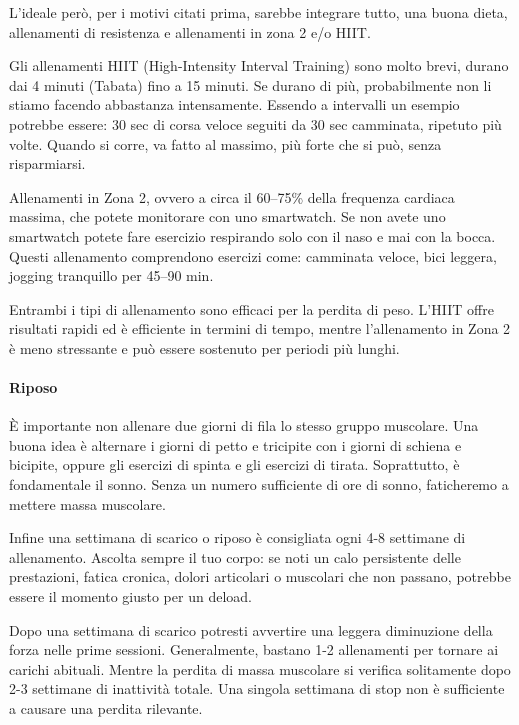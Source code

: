 \documentclass[12pt]{book} %
\begin{document}
L'ideale però, per i motivi citati prima, sarebbe integrare tutto, una buona dieta, allenamenti di resistenza e allenamenti in zona 2 e/o HIIT.

Gli allenamenti HIIT (High-Intensity Interval Training) sono molto brevi, durano dai 4 minuti (Tabata) fino a 15 minuti. Se durano di più, probabilmente non li stiamo facendo abbastanza intensamente.
Essendo a intervalli un esempio potrebbe essere: 30 sec di corsa veloce seguiti da 30 sec camminata, ripetuto più volte. Quando si corre, va fatto al massimo, più forte che si può, senza risparmiarsi.

Allenamenti in Zona 2, ovvero a circa il 60–75\% della frequenza cardiaca massima, che potete monitorare con uno smartwatch. Se non avete uno smartwatch potete fare esercizio respirando solo con il naso e mai con la bocca. Questi allenamento comprendono esercizi come: camminata veloce, bici leggera, jogging tranquillo per 45–90 min.

Entrambi i tipi di allenamento sono efficaci per la perdita di peso. L'HIIT offre risultati rapidi ed è efficiente in termini di tempo, mentre l'allenamento in Zona 2 è meno stressante e può essere sostenuto per periodi più lunghi.

\paragraph{Riposo}
È importante non allenare due giorni di fila lo stesso gruppo muscolare. Una buona idea è alternare i giorni di petto e tricipite con i giorni di schiena e bicipite, oppure gli esercizi di spinta e gli esercizi di tirata.
Soprattutto, è fondamentale il sonno. Senza un numero sufficiente di ore di sonno, faticheremo a mettere massa muscolare.

Infine una settimana di scarico o riposo è consigliata ogni 4-8 settimane di allenamento. Ascolta sempre il tuo corpo: se noti un calo persistente delle prestazioni, fatica cronica, dolori articolari o muscolari che non passano, potrebbe essere il momento giusto per un deload. 

Dopo una settimana di scarico potresti avvertire una leggera diminuzione della forza nelle prime sessioni. Generalmente, bastano 1-2 allenamenti per tornare ai carichi abituali. Mentre la perdita di massa muscolare si verifica solitamente dopo 2-3 settimane di inattività totale. Una singola settimana di stop non è sufficiente a causare una perdita rilevante.
\end{document}
